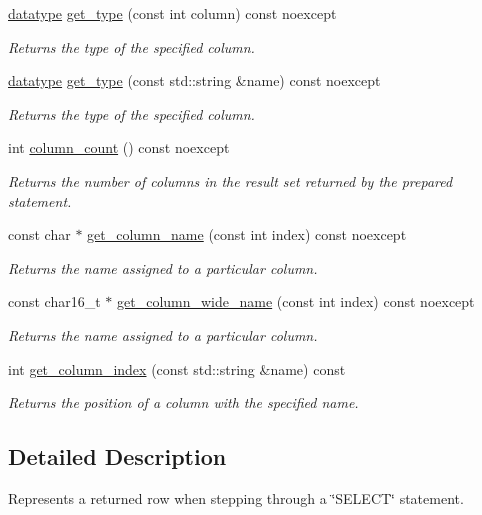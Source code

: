 \begin{DoxyCompactItemize}
\hyperlink{a00038_a7467e5cdd32bbf7fce35aced88682dc0}{datatype} \hyperlink{a00010_a2b8269e0f9387afa36ab90eb55899dc4}{get\-\_\-type} (const int column) const noexcept
\begin{DoxyCompactList}\small\item\em Returns the type of the specified column. \end{DoxyCompactList}\item 
\hyperlink{a00038_a7467e5cdd32bbf7fce35aced88682dc0}{datatype} \hyperlink{a00010_ac5ab606cf12aa4d2c9a183998420df44}{get\-\_\-type} (const std\-::string \&name) const noexcept
\begin{DoxyCompactList}\small\item\em Returns the type of the specified column. \end{DoxyCompactList}\item 
int \hyperlink{a00010_a7390afddbb1edc788f0afc6ce41f4562}{column\-\_\-count} () const noexcept
\begin{DoxyCompactList}\small\item\em Returns the number of columns in the result set returned by the prepared statement. \end{DoxyCompactList}\item 
const char $\ast$ \hyperlink{a00010_ad4c33f9b700a47c08f54e7b65afd34f2}{get\-\_\-column\-\_\-name} (const int index) const noexcept
\begin{DoxyCompactList}\small\item\em Returns the name assigned to a particular column. \end{DoxyCompactList}\item 
const char16\-\_\-t $\ast$ \hyperlink{a00010_aa7f2f528b10da75672e55fbc36566f9c}{get\-\_\-column\-\_\-wide\-\_\-name} (const int index) const noexcept
\begin{DoxyCompactList}\small\item\em Returns the name assigned to a particular column. \end{DoxyCompactList}\item 
int \hyperlink{a00010_aaca43590a209c2c7a0f7420c8a6c47b3}{get\-\_\-column\-\_\-index} (const std\-::string \&name) const
\begin{DoxyCompactList}\small\item\em Returns the position of a column with the specified name. \end{DoxyCompactList}\end{DoxyCompactItemize}


\subsection{Detailed Description}
Represents a returned row when stepping through a \char`\"{}\-S\-E\-L\-E\-C\-T\char`\"{} statement. 

